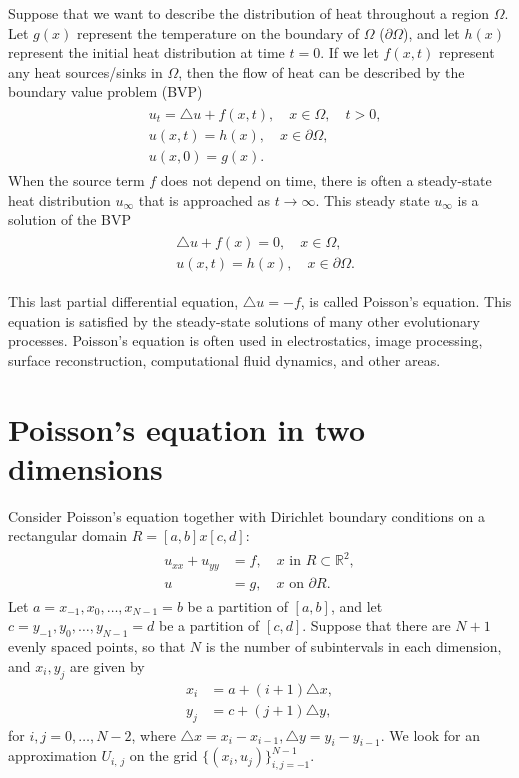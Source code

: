 \label{lab:poisson2d}
 
Suppose that we want to describe the distribution of heat throughout a region $\Omega$.
Let $g(x)$ represent the temperature on the boundary of $\Omega$ ($\partial \Omega$), and let $h(x)$ represent the initial heat distribution at time $t = 0$.
If we let $f(x,t)$ represent any heat sources/sinks in $\Omega$, then the flow of heat can be described by the boundary value problem (BVP)
\begin{align}
	\begin{split}
		& { } u_t = \triangle u + f(x,t), \quad x \in \Omega, \quad t >0,\\
		& { }u(x,t) = h(x), \quad x \in \partial \Omega, \\
		& { }u(x,0) = g(x).
	\end{split}
\end{align}
When the source term $f$ does not depend on time, there is often a steady-state heat distribution $u_{\infty}$ that is approached as $t \to \infty$.
This steady state $u_{\infty}$ is a solution of the BVP
\begin{align}
	\begin{split}
		& { }  \triangle u + f(x) = 0, \quad x \in \Omega,\\
		& { }u(x,t) = h(x), \quad x \in \partial \Omega.
	\end{split}
\end{align}

This last partial differential equation, $\triangle u = -f$, is called Poisson's equation.
This equation is satisfied by the steady-state solutions of many other evolutionary processes.
Poisson's equation is often used in electrostatics, image processing, surface reconstruction, computational fluid dynamics, and other areas. 


\section*{Poisson's equation in two dimensions}

 Consider Poisson's equation together with Dirichlet boundary conditions on a rectangular  domain $R = [a,b] x [c,d]$:
 \begin{align}
	\begin{split}
 	u_{xx} + u_{yy} &= f,\quad x \text{ in } R \subset \mathbb{R}^2,\\
 	u &= g, \quad x \text{ on } \partial R.
	\end{split}\label{eqn:2d_poisson}
\end{align}
Let $a = x_{-1}, x_0, \ldots, x_{N-1} = b$ be a partition of $[a,b]$, and let $c = y_{-1}, y_0, \ldots, y_{N-1} = d$ be a partition of $[c,d]$.
Suppose that there are $N+1$ evenly spaced points, so that $N$ is the number of subintervals in each dimension, and $x_i, y_j$ are given by 
\begin{align*}
	x_i &= a + (i+1)\triangle x, \\
	y_j &= c + (j+1)\triangle y,
\end{align*}
for $i,j = 0, \ldots, N-2$, where $\triangle x = x_i-x_{i-1}, \triangle y = y_i-y_{i-1}$.
We look for an approximation $U_{i,\,j}$ on the grid $\{(x_i,u_j)\}_{i,j=-1}^{N-1}$.

